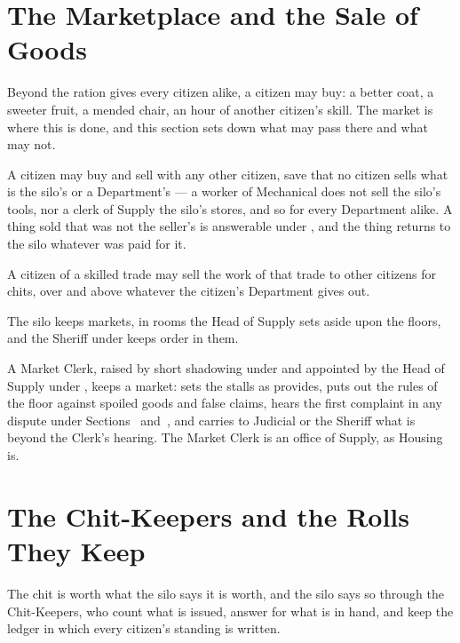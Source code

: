 \section{The Marketplace and the Sale of Goods}
\label{sec:commerce:marketplace-and-the-sale-of-goods}

Beyond the ration  gives every citizen alike, a citizen may buy: a better coat, a sweeter fruit, a mended chair, an hour of another citizen's skill. The market is where this is done, and this section sets down what may pass there and what may not.

\begin{clauses}
\item A citizen may buy and sell with any other citizen, save that no citizen sells what is the silo's or a Department's --- a worker of Mechanical does not sell the silo's tools, nor a clerk of Supply the silo's stores, and so for every Department alike. A thing sold that was not the seller's is answerable under , and the thing returns to the silo whatever was paid for it.
\item A citizen of a skilled trade may sell the work of that trade to other citizens for chits, over and above whatever the citizen's Department gives out.
\item The silo keeps markets, in rooms the Head of Supply sets aside upon the floors, and the Sheriff under  keeps order in them.
\item A Market Clerk, raised by short shadowing under  and appointed by the Head of Supply under , keeps a market: sets the stalls as  provides, puts out the rules of the floor against spoiled goods and false claims, hears the first complaint in any dispute under Sections~ and~, and carries to Judicial or the Sheriff what is beyond the Clerk's hearing. The Market Clerk is an office of Supply, as Housing is.
\end{clauses}

\section{The Chit-Keepers and the Rolls They Keep}
\label{sec:commerce:chit-keepers-and-the-rolls-they-keep}

The chit is worth what the silo says it is worth, and the silo says so through the Chit-Keepers, who count what is issued, answer for what is in hand, and keep the ledger in which every citizen's standing is written.


